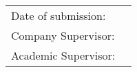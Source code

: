\begin{titlepage}
\begin{center}
	\vfill
	\begin{tabular}{ll}
		Date of submission:                     & \abgabe \\[0.2cm]
		Company Supervisor:   & \betreuerFirma \\[0.2cm]
		Academic Supervisor: & \betreuerDhbw \\[2cm]
	\end{tabular} 
\end{center}
\end{titlepage}
